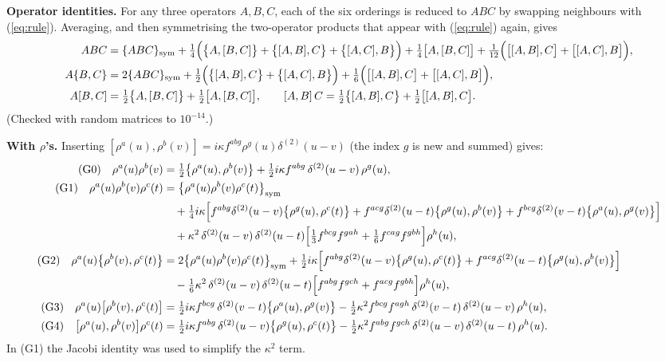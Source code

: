 \documentclass[10pt]{article}
\numberwithin{equation}{section}
\begin{document}
\noindent\textbf{Operator identities.} For any three operators $A,B,C$, each of the six orderings is reduced to $ABC$ by swapping neighbours with (\ref{eq:rule}). Averaging, and then symmetrising the two-operator products that appear with (\ref{eq:rule}) again, gives
\begin{align}
ABC&=\{ABC\}_{\rm sym}+\tfrac14\Big(\big\{A,[B,C]\big\}+\big\{[A,B],C\big\}+\big\{[A,C],B\big\}\Big)+\tfrac14\big[A,[B,C]\big]+\tfrac1{12}\Big(\big[[A,B],C\big]+\big[[A,C],B\big]\Big),\\
A\{B,C\}&=2\{ABC\}_{\rm sym}+\tfrac12\Big(\big\{[A,B],C\big\}+\big\{[A,C],B\big\}\Big)+\tfrac16\Big(\big[[A,B],C\big]+\big[[A,C],B\big]\Big),\\
A[B,C]&=\tfrac12\big\{A,[B,C]\big\}+\tfrac12\big[A,[B,C]\big],\qquad [A,B]\,C=\tfrac12\big\{[A,B],C\big\}+\tfrac12\big[[A,B],C\big].
\end{align}
(Checked with random matrices to $10^{-14}$.)

\noindent\textbf{With $\rho$'s.} Inserting $[\rho^{a}(u),\rho^{b}(v)]=i\kappa f^{abg}\rho^{g}(u)\delta^{(2)}(u-v)$ (the index $g$ is new and summed) gives:
\begin{align}
\text{(G0)}\quad\rho^{a}(u)\rho^{b}(v)&=\tfrac12\big\{\rho^{a}(u),\rho^{b}(v)\big\}+\tfrac12 i\kappa f^{abg}\,\delta^{(2)}(u-v)\,\rho^{g}(u),\\
\text{(G1)}\quad\rho^{a}(u)\rho^{b}(v)\rho^{c}(t)&=\big\{\rho^{a}(u)\rho^{b}(v)\rho^{c}(t)\big\}_{\rm sym}\notag\\
&\quad+\tfrac14 i\kappa\Big[f^{abg}\delta^{(2)}(u-v)\big\{\rho^{g}(u),\rho^{c}(t)\big\}+f^{acg}\delta^{(2)}(u-t)\big\{\rho^{g}(u),\rho^{b}(v)\big\}+f^{bcg}\delta^{(2)}(v-t)\big\{\rho^{a}(u),\rho^{g}(v)\big\}\Big]\notag\\
&\quad+\kappa^{2}\,\delta^{(2)}(u-v)\,\delta^{(2)}(u-t)\Big[\tfrac13 f^{bcg}f^{gah}+\tfrac16 f^{cag}f^{gbh}\Big]\rho^{h}(u),\\
\text{(G2)}\quad\rho^{a}(u)\big\{\rho^{b}(v),\rho^{c}(t)\big\}&=2\big\{\rho^{a}(u)\rho^{b}(v)\rho^{c}(t)\big\}_{\rm sym}+\tfrac12 i\kappa\Big[f^{abg}\delta^{(2)}(u-v)\big\{\rho^{g}(u),\rho^{c}(t)\big\}+f^{acg}\delta^{(2)}(u-t)\big\{\rho^{g}(u),\rho^{b}(v)\big\}\Big]\notag\\
&\quad-\tfrac16\kappa^{2}\,\delta^{(2)}(u-v)\,\delta^{(2)}(u-t)\Big[f^{abg}f^{gch}+f^{acg}f^{gbh}\Big]\rho^{h}(u),\\
\text{(G3)}\quad\rho^{a}(u)\big[\rho^{b}(v),\rho^{c}(t)\big]&=\tfrac12 i\kappa f^{bcg}\,\delta^{(2)}(v-t)\big\{\rho^{a}(u),\rho^{g}(v)\big\}-\tfrac12\kappa^{2}f^{bcg}f^{agh}\,\delta^{(2)}(v-t)\,\delta^{(2)}(u-v)\,\rho^{h}(u),\\
\text{(G4)}\quad\big[\rho^{a}(u),\rho^{b}(v)\big]\rho^{c}(t)&=\tfrac12 i\kappa f^{abg}\,\delta^{(2)}(u-v)\big\{\rho^{g}(u),\rho^{c}(t)\big\}-\tfrac12\kappa^{2}f^{abg}f^{gch}\,\delta^{(2)}(u-v)\,\delta^{(2)}(u-t)\,\rho^{h}(u).
\end{align}
In (G1) the Jacobi identity was used to simplify the $\kappa^{2}$ term.
\end{document}
